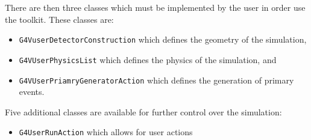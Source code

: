 There are then three classes which must be implemented by the user in order use the toolkit. These classes are:
\begin{itemize}
    \item \verb+G4VuserDetectorConstruction+ which defines the geometry of the simulation,
    \item \verb+G4VUserPhysicsList+ which defines the physics of the simulation, and
    \item \verb+G4VUserPriamryGeneratorAction+ which defines the generation of primary events.
\end{itemize}
Five additional classes are available for further control over the simulation:
\begin{itemize}
    \item \verb+G4UserRunAction+ which allows for user actions
\end{itemize}
